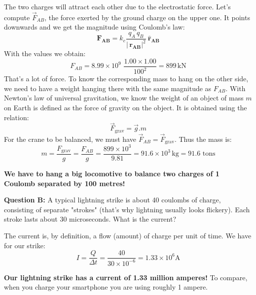 \documentclass[12pt]{article}
\begin{document}
{\color{blue}
The two charges will attract each other due to the electrostatic force. Let's compute $\vec{F}_{AB}$, the force exerted by the ground charge on the upper one.
It points downwards and we get the magnitude using Coulomb's law:
\begin{equation}
 \mathbf{F_{AB}} = k_e \frac{q_A \, q_B}{| \, \mathbf{r_{AB}}|^2} \: \mathbf{\hat{r}_{AB}}
\end{equation}
With the values we obtain:
\begin{equation}
 F_{AB} = 8.99 \times 10^9 \, \, \frac{1.00 \times 1.00}{  100 ^2}  = 899 \, \text{kN}
\end{equation}
That's a lot of force. To know the corresponding mass to hang on the other side, we need to have a weight hanging there with the same magnitude as $F_{AB}$. 
With Newton's law of universal gravitation, we know the weight of an object of mass $m$ on Earth is defined as the force of gravity on the object. It is obtained using the relation:
\begin{equation}
 \vec{F}_\text{grav} = \vec{g} . m
\end{equation}
For the crane to be balanced, we must have $\vec{F}_{AB} = \vec{F}_\text{grav}$. Thus the mass is:
\begin{equation}
 m = \frac{F_\text{grav}}{g} = \frac{F_{AB}}{g} = \frac{899 \times 10^3}{9.81} = 91.6 \times 10^3 \, \text{kg} =  91.6 \, \, \text{tons}
\end{equation}

\textbf{We have to hang a big locomotive to balance two charges of 1 Coulomb separated by 100 metres!}
}
\newline

\textbf{Question B:} A typical lightning strike is about 40 coulombs of charge, consisting of separate "strokes" (that's why lightning usually looks flickery). Each stroke lasts about 30 microseconds. What is the current?\\

{\color{blue}
The current is, by definition, a flow (amount) of charge per unit of time. We have for our strike:
\begin{equation}
 I = \frac{Q}{\Delta t} = \frac{40 }{30 \times 10^{-6} } = 1.33 \times 10^6 \text{A}
\end{equation}

\textbf{Our lightning strike has a current of 1.33 million amperes!}
\newline
To compare, when you charge your smartphone you are using roughly 1 ampere.

}
\end{document}
